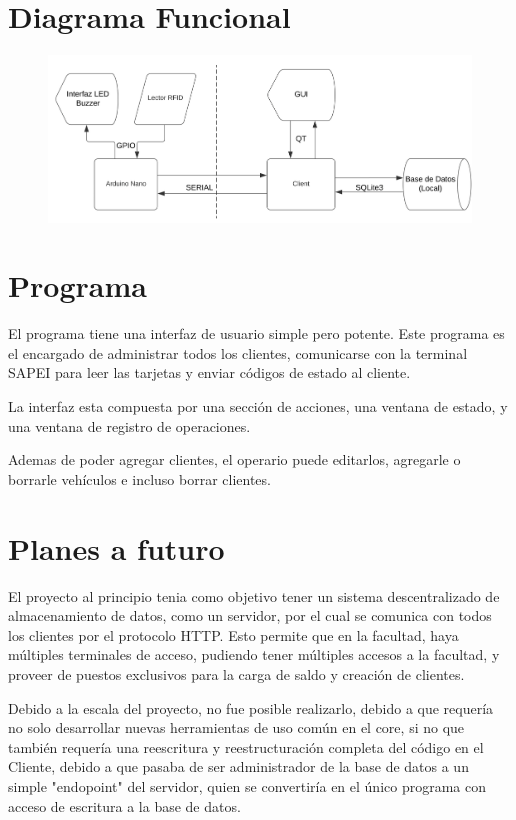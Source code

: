 \documentclass[a4paper, 12pt]{report}
\begin{document}
\section{Diagrama Funcional}
    \begin{figure}[h]
        \centering
        \includegraphics[width=1\textwidth]{./image1.png}
    \end{figure}

\section{Programa}
    El programa tiene una interfaz de usuario simple pero potente. Este programa es el encargado de administrar todos
    los clientes, comunicarse con la terminal SAPEI para leer las tarjetas y enviar códigos de estado al cliente.

    La interfaz esta compuesta por una sección de acciones, una ventana de estado, y una ventana de registro de
    operaciones.

    Ademas de poder agregar clientes, el operario puede editarlos, agregarle o borrarle vehículos e incluso borrar
    clientes.

\newpage
\section{Planes a futuro}
    El proyecto al principio tenia como objetivo tener un sistema descentralizado de almacenamiento de datos, como un
    servidor, por el cual se comunica con todos los clientes por el protocolo HTTP. Esto permite que en la facultad,
    haya múltiples terminales de acceso, pudiendo tener múltiples accesos a la facultad, y proveer de puestos
    exclusivos para la carga de saldo y creación de clientes.

    Debido a la escala del proyecto, no fue posible realizarlo, debido a que requería no solo desarrollar nuevas
    herramientas de uso común en el core, si no que también requería una reescritura y reestructuración completa del
    código en el Cliente, debido a que pasaba de ser administrador de la base de datos a un simple "endopoint" del
    servidor, quien se convertiría en el único programa con acceso de escritura a la base de datos.
\end{document}
